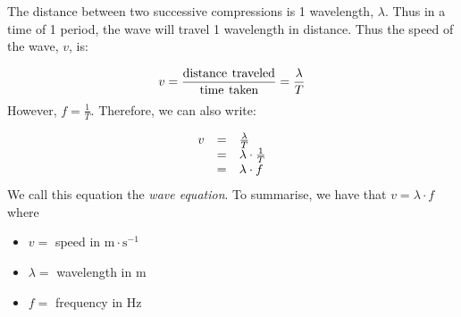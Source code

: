   
        \label{m38806*id319706}The distance between two successive compressions is 1 wavelength, $\lambda$. Thus in a time of 1 period, the wave will travel 1 wavelength in distance. Thus the speed of the wave, $v$, is:\par 
        \label{m38806*id319732}\nopagebreak\noindent{}
    \begin{equation}
    v=\frac{\text{distance}\phantom{\rule{4.pt}{0ex}}\text{traveled}}{\text{time}\phantom{\rule{4.pt}{0ex}}\text{taken}}=\frac{\lambda }{T}
      \end{equation}
        \label{m38806*id319776}However, $f=\frac{1}{T}$. Therefore, we can also write:\par 
        \label{m38806*id319802}\nopagebreak\noindent{}
          
    \begin{equation}
    \begin{array}{ccc}\hfill v& =& \frac{\lambda }{T}\hfill \\ & =& \lambda \ensuremath{\cdot}\frac{1}{T}\hfill \\ & =& \lambda \ensuremath{\cdot}f\hfill \end{array}
      \end{equation}
        \label{m38806*id319870}We call this equation the \textsl{wave equation}. To summarise, we have that $v=\lambda \ensuremath{\cdot}f$ where\par 
        \label{m38806*id319901}\begin{itemize}[noitemsep]
            \label{m38806*uid22}\item $v=$ speed in $\text{m}\ensuremath{\cdot}\text{s}{}^{-1}$\label{m38806*uid23}\item $\lambda =$ wavelength in $\text{m}$
\item $f=$ frequency in $\text{Hz}$
\end{itemize}
\par

